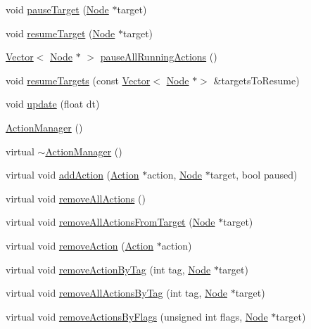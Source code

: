 \begin{DoxyCompactItemize}
\item 
void \hyperlink{classActionManager_a321523c8720cd7e8a973d959e5fdebf9}{pause\+Target} (\hyperlink{classNode}{Node} $\ast$target)
\item 
void \hyperlink{classActionManager_ac65bf5b5a646ca46d2db9fdb5590a0ba}{resume\+Target} (\hyperlink{classNode}{Node} $\ast$target)
\item 
\hyperlink{classVector}{Vector}$<$ \hyperlink{classNode}{Node} $\ast$ $>$ \hyperlink{classActionManager_aa98a62956dd3f0c7dad23e2a3cee2361}{pause\+All\+Running\+Actions} ()
\item 
void \hyperlink{classActionManager_abf8edeb8d4d6454cc428b3569b15c9d9}{resume\+Targets} (const \hyperlink{classVector}{Vector}$<$ \hyperlink{classNode}{Node} $\ast$$>$ \&targets\+To\+Resume)
\item 
void \hyperlink{classActionManager_ab4f35fe52781cc9d972c89f8ab2381a9}{update} (float dt)
\item 
\hyperlink{classActionManager_a7d0c405d568795fba0c51f411e77b821}{Action\+Manager} ()
\item 
virtual \hyperlink{classActionManager_ad11fb012c44ddeb403559ec25744f463}{$\sim$\+Action\+Manager} ()
\item 
virtual void \hyperlink{classActionManager_a4293541c368e2e8cea16eb5240a2df9b}{add\+Action} (\hyperlink{classAction}{Action} $\ast$action, \hyperlink{classNode}{Node} $\ast$target, bool paused)
\item 
virtual void \hyperlink{classActionManager_ab55980ae7d5a8f211f0f7fc8d22123f3}{remove\+All\+Actions} ()
\item 
virtual void \hyperlink{classActionManager_ab258c22774156c41fad6e4526aadaa63}{remove\+All\+Actions\+From\+Target} (\hyperlink{classNode}{Node} $\ast$target)
\item 
virtual void \hyperlink{classActionManager_ab564bd417def5a377a2010ae076dcc6d}{remove\+Action} (\hyperlink{classAction}{Action} $\ast$action)
\item 
virtual void \hyperlink{classActionManager_a69aa53f99fdfdc4777119fb4a415cf81}{remove\+Action\+By\+Tag} (int tag, \hyperlink{classNode}{Node} $\ast$target)
\item 
virtual void \hyperlink{classActionManager_ad505f0a5b1decdb589bd08eae388f812}{remove\+All\+Actions\+By\+Tag} (int tag, \hyperlink{classNode}{Node} $\ast$target)
\item 
virtual void \hyperlink{classActionManager_af30574d91d70035641890f5e8014ada4}{remove\+Actions\+By\+Flags} (unsigned int flags, \hyperlink{classNode}{Node} $\ast$target)
$$
\end{DoxyCompactItemize}
